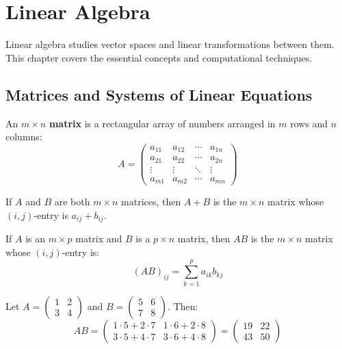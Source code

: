 \chapter{Linear Algebra}

Linear algebra studies vector spaces and linear transformations between them. This chapter covers the essential concepts and computational techniques.

\section{Matrices and Systems of Linear Equations}

\begin{definition}[Matrix]
An $m \times n$ \textbf{matrix} is a rectangular array of numbers arranged in $m$ rows and $n$ columns:
\[A = \begin{pmatrix}
a_{11} & a_{12} & \cdots & a_{1n} \\
a_{21} & a_{22} & \cdots & a_{2n} \\
\vdots & \vdots & \ddots & \vdots \\
a_{m1} & a_{m2} & \cdots & a_{mn}
\end{pmatrix}\]
\end{definition}

\begin{definition}
If $A$ and $B$ are both $m \times n$ matrices, then $A + B$ is the $m \times n$ matrix whose $(i,j)$-entry is $a_{ij} + b_{ij}$.
\end{definition}

\begin{definition}
If $A$ is an $m \times p$ matrix and $B$ is a $p \times n$ matrix, then $AB$ is the $m \times n$ matrix whose $(i,j)$-entry is:
\[(AB)_{ij} = \sum_{k=1}^{p} a_{ik}b_{kj}\]
\end{definition}

\begin{example}
Let $A = \begin{pmatrix} 1 & 2 \\ 3 & 4 \end{pmatrix}$ and $B = \begin{pmatrix} 5 & 6 \\ 7 & 8 \end{pmatrix}$. Then:
\[AB = \begin{pmatrix} 1 \cdot 5 + 2 \cdot 7 & 1 \cdot 6 + 2 \cdot 8 \\ 3 \cdot 5 + 4 \cdot 7 & 3 \cdot 6 + 4 \cdot 8 \end{pmatrix} = \begin{pmatrix} 19 & 22 \\ 43 & 50 \end{pmatrix}\]
\end{example}

